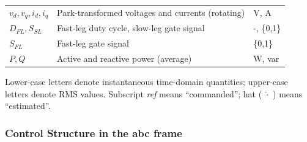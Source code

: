 \documentclass[11pt]{article}
\begin{document}
\begin{longtable}[]{@{}lll@{}}
\begin{minipage}[t]{0.30\columnwidth}\raggedright
\(v_d, v_q, i_d, i_q\)\strut
\end{minipage} & \begin{minipage}[t]{0.34\columnwidth}\raggedright
Park-transformed voltages and currents (rotating)\strut
\end{minipage} & \begin{minipage}[t]{0.27\columnwidth}\raggedright
V, A\strut
\end{minipage}\tabularnewline
\begin{minipage}[t]{0.30\columnwidth}\raggedright
\(D_{FL}, S_{SL}\)\strut
\end{minipage} & \begin{minipage}[t]{0.34\columnwidth}\raggedright
Fast-leg duty cycle, slow-leg gate signal\strut
\end{minipage} & \begin{minipage}[t]{0.27\columnwidth}\raggedright
-, \{0,1\}\strut
\end{minipage}\tabularnewline
\begin{minipage}[t]{0.30\columnwidth}\raggedright
\(S_{FL}\)\strut
\end{minipage} & \begin{minipage}[t]{0.34\columnwidth}\raggedright
Fast-leg gate signal\strut
\end{minipage} & \begin{minipage}[t]{0.27\columnwidth}\raggedright
\{0,1\}\strut
\end{minipage}\tabularnewline
\begin{minipage}[t]{0.30\columnwidth}\raggedright
\(P, Q\)\strut
\end{minipage} & \begin{minipage}[t]{0.34\columnwidth}\raggedright
Active and reactive power (average)\strut
\end{minipage} & \begin{minipage}[t]{0.27\columnwidth}\raggedright
W, var\strut
\end{minipage}\tabularnewline
\bottomrule
\end{longtable}

Lower-case letters denote instantaneous time-domain quantities;
upper-case letters denote RMS values. Subscript \emph{ref} means
``commanded''; hat ( \(\hat{\cdot}\) ) means ``estimated''.

    \hypertarget{control-structure-in-the-abc-frame}{%
\subsubsection{Control Structure in the abc
frame}\label{control-structure-in-the-abc-frame}}
\end{document}
